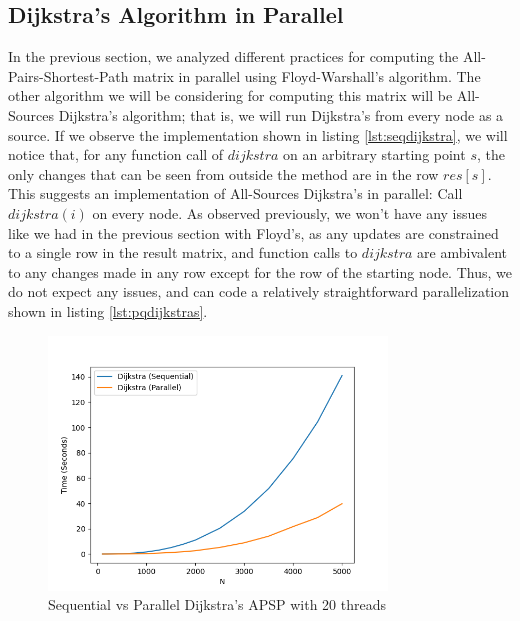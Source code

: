 \documentclass[conference]{IEEEtran}
\begin{document}
\subsection{Dijkstra's Algorithm in Parallel}\label{AA}
In the previous section, we analyzed different practices for computing the All-Pairs-Shortest-Path matrix in parallel using Floyd-Warshall's algorithm. The other algorithm we will be considering for computing this matrix will be All-Sources Dijkstra's algorithm; that is, we will run Dijkstra's from every node as a source. If we observe the implementation shown in listing \ref{lst:seqdijkstra}, we will notice that, for any function call of $dijkstra$ on an arbitrary starting point $s$, the only changes that can be seen from outside the method are in the row $res[s]$. This suggests an implementation of All-Sources Dijkstra's in parallel: Call $dijkstra(i)$ on every node. As observed previously, we won't have any issues like we had in the previous section with Floyd's, as any updates are constrained to a single row in the result matrix, and function calls to $dijkstra$ are ambivalent to any changes made in any row except for the row of the starting node. Thus, we do not expect any issues, and can code a relatively straightforward parallelization shown in listing \ref{lst:pqdijkstras}.

\begin{figure}[t]
    
\end{figure}

\begin{figure}[t]
    \centering
    \includegraphics[width=9cm]{images/benchpq.png}
    \caption{Sequential vs Parallel Dijkstra's APSP with 20 threads}
    \label{fig:dijkstra_pq}
\end{figure}
\end{document}
